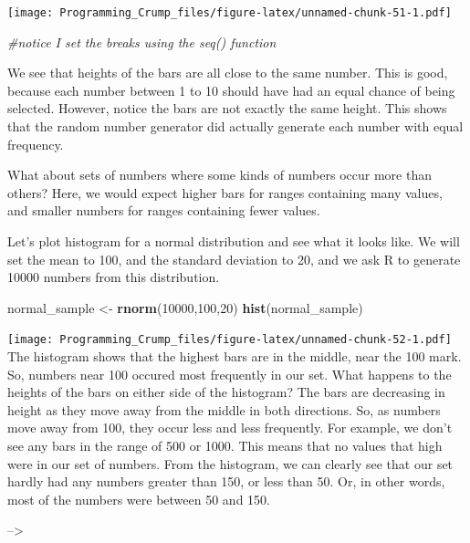 \documentclass[]{book}
\newenvironment{Shaded}{\begin{snugshade}}{\end{snugshade}}
\newcommand{\KeywordTok}[1]{\textcolor[rgb]{0.13,0.29,0.53}{\textbf{{#1}}}}
\newcommand{\DecValTok}[1]{\textcolor[rgb]{0.00,0.00,0.81}{{#1}}}
\newcommand{\StringTok}[1]{\textcolor[rgb]{0.31,0.60,0.02}{{#1}}}
\newcommand{\CommentTok}[1]{\textcolor[rgb]{0.56,0.35,0.01}{\textit{{#1}}}}
\newcommand{\NormalTok}[1]{{#1}}
\theoremstyle{definition}
\theoremstyle{definition}
\theoremstyle{definition}
\theoremstyle{remark}
\begin{document}
\texttt{[image: Programming\_Crump\_files/figure-latex/unnamed-chunk-51-1.pdf]}

\begin{Shaded}
\begin{Highlighting}[]
\CommentTok{#notice I set the breaks using the seq() function}
\end{Highlighting}
\end{Shaded}

We see that heights of the bars are all close to the same number. This
is good, because each number between 1 to 10 should have had an equal
chance of being selected. However, notice the bars are not exactly the
same height. This shows that the random number generator did actually
generate each number with equal frequency.

What about sets of numbers where some kinds of numbers occur more than
others? Here, we would expect higher bars for ranges containing many
values, and smaller numbers for ranges containing fewer values.

Let's plot histogram for a normal distribution and see what it looks
like. We will set the mean to 100, and the standard deviation to 20, and
we ask R to generate 10000 numbers from this distribution.

\begin{Shaded}
\begin{Highlighting}[]
\NormalTok{normal_sample <-}\StringTok{ }\KeywordTok{rnorm}\NormalTok{(}\DecValTok{10000}\NormalTok{,}\DecValTok{100}\NormalTok{,}\DecValTok{20}\NormalTok{)}
\KeywordTok{hist}\NormalTok{(normal_sample)}
\end{Highlighting}
\end{Shaded}

\texttt{[image: Programming\_Crump\_files/figure-latex/unnamed-chunk-52-1.pdf]}
The histogram shows that the highest bars are in the middle, near the
100 mark. So, numbers near 100 occured most frequently in our set. What
happens to the heights of the bars on either side of the histogram? The
bars are decreasing in height as they move away from the middle in both
directions. So, as numbers move away from 100, they occur less and less
frequently. For example, we don't see any bars in the range of 500 or
1000. This means that no values that high were in our set of numbers.
From the histogram, we can clearly see that our set hardly had any
numbers greater than 150, or less than 50. Or, in other words, most of
the numbers were between 50 and 150.

--\textgreater{}
\end{document}
